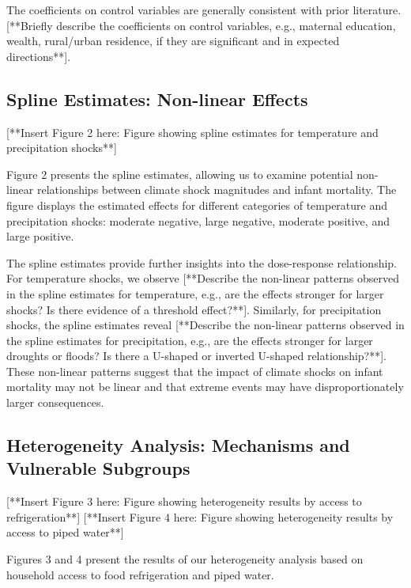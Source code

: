 \documentclass[12pt]{article}
\begin{document}
The coefficients on control variables are generally consistent with prior literature. [**Briefly describe the coefficients on control variables, e.g., maternal education, wealth, rural/urban residence, if they are significant and in expected directions**].

\subsection{Spline Estimates: Non-linear Effects}

[**Insert Figure 2 here: Figure showing spline estimates for temperature and precipitation shocks**]

Figure 2 presents the spline estimates, allowing us to examine potential non-linear relationships between climate shock magnitudes and infant mortality.  The figure displays the estimated effects for different categories of temperature and precipitation shocks: moderate negative, large negative, moderate positive, and large positive.

The spline estimates provide further insights into the dose-response relationship.  For temperature shocks, we observe [**Describe the non-linear patterns observed in the spline estimates for temperature, e.g., are the effects stronger for larger shocks? Is there evidence of a threshold effect?**].  Similarly, for precipitation shocks, the spline estimates reveal [**Describe the non-linear patterns observed in the spline estimates for precipitation, e.g., are the effects stronger for larger droughts or floods? Is there a U-shaped or inverted U-shaped relationship?**].  These non-linear patterns suggest that the impact of climate shocks on infant mortality may not be linear and that extreme events may have disproportionately larger consequences.

\subsection{Heterogeneity Analysis: Mechanisms and Vulnerable Subgroups}

[**Insert Figure 3 here: Figure showing heterogeneity results by access to refrigeration**]
[**Insert Figure 4 here: Figure showing heterogeneity results by access to piped water**]

Figures 3 and 4 present the results of our heterogeneity analysis based on household access to food refrigeration and piped water.
\end{document}
